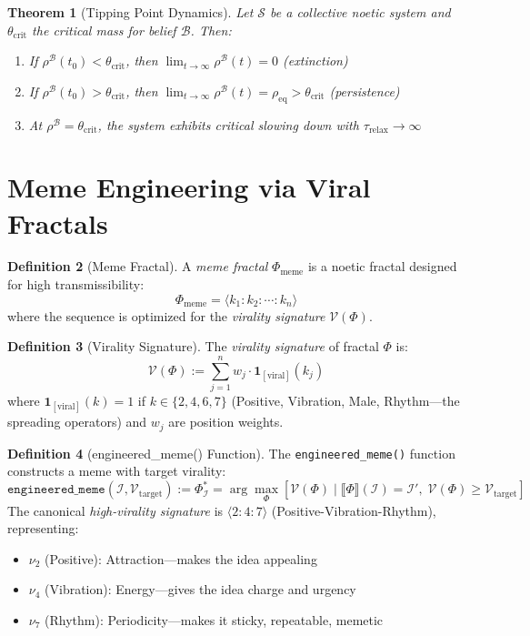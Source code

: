 \documentclass[11pt,twoside]{book}
\theoremstyle{definition}
\newtheorem{definition}{Definition}[chapter]
\theoremstyle{plain}
\newtheorem{theorem}[definition]{Theorem}
\theoremstyle{remark}
\newcommand{\sem}[1]{\llbracket #1 \rrbracket}
\newcommand{\noe}[1]{\nu_{#1}}
\newcommand{\Frac}{\Phi}
\begin{document}
\begin{theorem}[Tipping Point Dynamics]
\label{thm:tipping-dynamics}
Let $\mathcal{S}$ be a collective noetic system and $\theta_{\mathrm{crit}}$ the critical mass for belief $\mathcal{B}$. Then:
\begin{enumerate}
    \item If $\rho^{\mathcal{B}}(t_0) < \theta_{\mathrm{crit}}$, then $\lim_{t \to \infty} \rho^{\mathcal{B}}(t) = 0$ (extinction)
    \item If $\rho^{\mathcal{B}}(t_0) > \theta_{\mathrm{crit}}$, then $\lim_{t \to \infty} \rho^{\mathcal{B}}(t) = \rho_{\mathrm{eq}} > \theta_{\mathrm{crit}}$ (persistence)
    \item At $\rho^{\mathcal{B}} = \theta_{\mathrm{crit}}$, the system exhibits critical slowing down with $\tau_{\mathrm{relax}} \to \infty$
\end{enumerate}
\end{theorem}

\section{Meme Engineering via Viral Fractals}

\begin{definition}[Meme Fractal]
\label{def:meme-fractal}
A \emph{meme fractal} $\Frac_{\mathrm{meme}}$ is a noetic fractal designed for high transmissibility:
\[
    \Frac_{\mathrm{meme}} = \langle k_1 : k_2 : \cdots : k_n \rangle
\]
where the sequence is optimized for the \emph{virality signature} $\mathcal{V}(\Frac)$.
\end{definition}

\begin{definition}[Virality Signature]
\label{def:virality-signature}
The \emph{virality signature} of fractal $\Frac$ is:
\[
    \mathcal{V}(\Frac) := \sum_{j=1}^{n} w_j \cdot \mathbf{1}_{[\text{viral}]}(k_j)
\]
where $\mathbf{1}_{[\text{viral}]}(k) = 1$ if $k \in \{2, 4, 6, 7\}$ (Positive, Vibration, Male, Rhythm---the spreading operators) and $w_j$ are position weights.
\end{definition}

\begin{definition}[engineered\_meme() Function]
\label{def:engineered-meme}
The \texttt{engineered\_meme()} function constructs a meme with target virality:
\[
\boxed{
    \mathtt{engineered\_meme}(\mathcal{I}, \mathcal{V}_{\mathrm{target}}) :=
    \Frac_{\mathcal{I}}^* = \arg\max_{\Frac} \left[ \mathcal{V}(\Frac) \;\Big|\;
    \sem{\Frac}(\mathcal{I}) = \mathcal{I}', \; \mathcal{V}(\Frac) \geq \mathcal{V}_{\mathrm{target}} \right]
}
\]
The canonical \emph{high-virality signature} is $\langle 2:4:7 \rangle$ (Positive-Vibration-Rhythm), representing:
\begin{itemize}
    \item $\noe{2}$ (Positive): Attraction---makes the idea appealing
    \item $\noe{4}$ (Vibration): Energy---gives the idea charge and urgency
    \item $\noe{7}$ (Rhythm): Periodicity---makes it sticky, repeatable, memetic
\end{itemize}
\end{definition}
\end{document}
